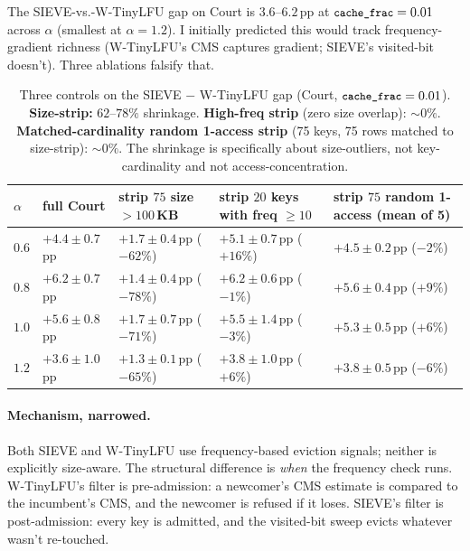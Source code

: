 \documentclass[letterpaper,twocolumn,10pt]{article}
\newcommand{\code}[1]{\texttt{\small #1}}
\begin{document}
The SIEVE-vs.-W-TinyLFU gap on Court is $3.6$--$6.2$\,pp at
$\code{cache\_frac} = 0.01$ across $\alpha$ (smallest at $\alpha=1.2$). I initially predicted
this would track frequency-gradient richness (W-TinyLFU's CMS captures
gradient; SIEVE's visited-bit doesn't). Three ablations falsify that.

\begin{table}[t]
\centering
\footnotesize
\renewcommand{\arraystretch}{0.95}
\begin{tabularx}{\textwidth}{@{}lXXXX@{}}
\toprule
$\alpha$ & full Court & strip $75$ size $> 100$\,KB & strip $20$ keys with freq $\geq 10$ & strip $75$ random 1-access (mean of 5) \\
\midrule
$0.6$ & $+4.4 \pm 0.7$\,pp & $+1.7 \pm 0.4$\,pp ($-62\%$) & $+5.1 \pm 0.7$\,pp ($+16\%$) & $+4.5 \pm 0.2$\,pp ($-2\%$) \\
$0.8$ & $+6.2 \pm 0.7$\,pp & $+1.4 \pm 0.4$\,pp ($-78\%$) & $+6.2 \pm 0.6$\,pp ($-1\%$) & $+5.6 \pm 0.4$\,pp ($+9\%$) \\
$1.0$ & $+5.6 \pm 0.8$\,pp & $+1.7 \pm 0.7$\,pp ($-71\%$) & $+5.5 \pm 1.4$\,pp ($-3\%$) & $+5.3 \pm 0.5$\,pp ($+6\%$) \\
$1.2$ & $+3.6 \pm 1.0$\,pp & $+1.3 \pm 0.1$\,pp ($-65\%$) & $+3.8 \pm 1.0$\,pp ($+6\%$) & $+3.8 \pm 0.5$\,pp ($-6\%$) \\
\bottomrule
\end{tabularx}
\caption{Three controls on the SIEVE $-$ W-TinyLFU gap (Court,
$\code{cache\_frac} = 0.01$). \textbf{Size-strip:} $62$--$78\%$
shrinkage. \textbf{High-freq strip} (zero size overlap): $\sim 0\%$.
\textbf{Matched-cardinality random 1-access strip} (75 keys, 75 rows
matched to size-strip): $\sim 0\%$. The shrinkage is specifically
about size-outliers, not key-cardinality and not access-concentration.}
\label{tab:mechanism-decomp}
\end{table}

\paragraph{Mechanism, narrowed.} Both SIEVE and W-TinyLFU use
frequency-based eviction signals; neither is explicitly size-aware.
The structural difference is \emph{when} the frequency check runs.
W-TinyLFU's filter is pre-admission: a newcomer's CMS estimate is
compared to the incumbent's CMS, and the newcomer is refused if it
loses. SIEVE's filter is post-admission: every key is admitted, and
the visited-bit sweep evicts whatever wasn't re-touched.
\end{document}
